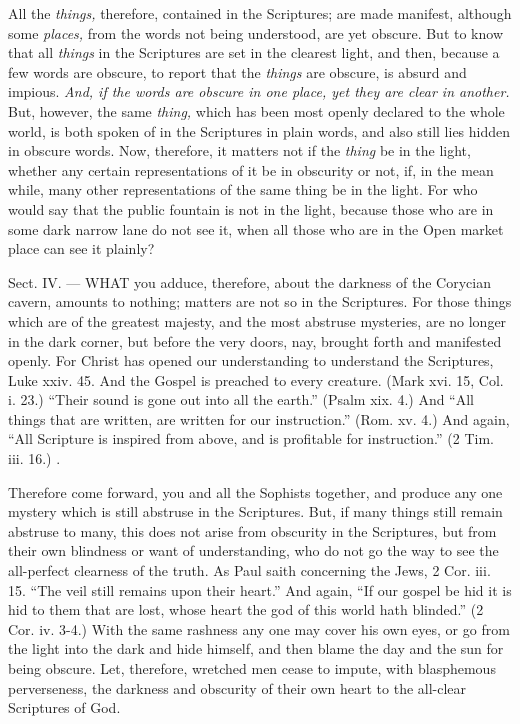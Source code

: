 All the \emph{things, }therefore, contained in the Scriptures; are made manifest, although some \emph{places, }from the words not being understood, are yet obscure. But to know that all \emph{things} in the Scriptures are set in the clearest light, and then, because a few words are obscure, to report that the \emph{things }are obscure, is absurd and impious. \emph{ And, if the words are obscure in one place, yet they are clear in another. }But, however, the same \emph{thing, }which has been most openly declared to the whole world, is both spoken of in the Scriptures in plain words, and also still lies hidden in obscure words. Now, therefore, it matters not if the \emph{thing }be in the light, whether any certain representations of it be in obscurity or not, if, in the mean while, many other representations of the same thing be in the light. For who would say that the public fountain is not in the light, because those who are in some dark narrow lane do not see it, when all those who are in the Open market place can see it plainly?


Sect. IV. — WHAT you adduce, therefore, about the darkness of the Corycian cavern, amounts to nothing; matters are not so in the Scriptures. For those things which are of the greatest majesty, and the most abstruse mysteries, are no longer in the dark corner, but before the very doors, nay, brought forth and manifested openly. For Christ has opened our understanding to understand the Scriptures, Luke xxiv. 45. And the Gospel is preached to every creature. (Mark xvi. 15, Col. i. 23.) “Their sound is gone out into all the earth.” (Psalm xix. 4.) And “All things that are written, are written for our instruction.” (Rom. xv. 4.) And again, “All Scripture is inspired from above, and is profitable for instruction.” (2 Tim. iii. 16.) .

Therefore come forward, you and all the Sophists together, and produce any one mystery which is still abstruse in the Scriptures. But, if many things still remain abstruse to many, this does not arise from obscurity in the Scriptures, but from their own blindness or want of understanding, who do not go the way to see the all-perfect clearness of the truth. As Paul saith concerning the Jews, 2 Cor. iii. 15. “The veil still remains upon their heart.” And again, “If our gospel be hid it is hid to them that are lost, whose heart the god of this world hath blinded.” (2 Cor. iv. 3-4.) With the same rashness any one may cover his own eyes, or go from the light into the dark and hide himself, and then blame the day and the sun for being obscure. Let, therefore, wretched men cease to impute, with blasphemous perverseness, the darkness and obscurity of their own heart to the all-clear Scriptures of God.

